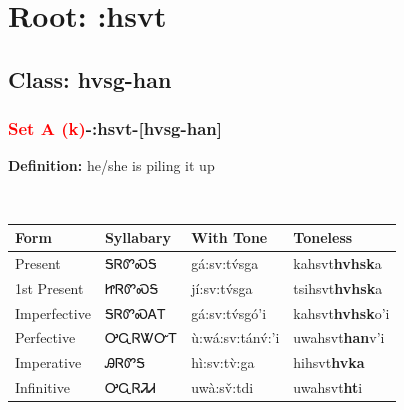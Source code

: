 \needspace{4in}
\section*{Root: :hsvt}
\nopagebreak
{}
\needspace{3in}
\subsection*{Class: hvsg-han}
\nopagebreak
\needspace{2in}
\subsubsection*{\textcolor{Red}{Set A (k)}{-}\textbf{:hsvt}{-}[hvsg-han]}
\nopagebreak
\textbf{Definition: } he/she is piling it up
\\[0.5em]
\begin{tabularx}{\textwidth}{l X X X}%
\toprule%
\textbf{Form}&\textbf{Syllabary}&\textbf{With Tone}&\textbf{Toneless}\\%
\midrule%
Present&ᎦᏒᏛᏍᎦ&gá:sv:tv́sga&kahsvt\textbf{hvhsk}a\\%
1st Present&ᏥᏒᏛᏍᎦ&jí:sv:tv́sga&tsihsvt\textbf{hvhsk}a\\%
Imperfective&ᎦᏒᏛᏍᎪᎢ&gá:sv:tv́sgó’i&kahsvt\textbf{hvhsk}o'i\\%
Perfective&ᎤᏩᏒᏔᏅᎢ&ù:wá:sv:tánv́:’i&uwahsvt\textbf{han}v'i\\%
Imperative&ᎯᏒᏛᎦ&hì:sv:tv̀:ga&hihsvt\textbf{hvka}\\%
Infinitive&ᎤᏩᏒᏘᏗ&uwà:sv̌:tdi&uwahsvt\textbf{ht}i\\%
\bottomrule%
\end{tabularx}
\\[1em]